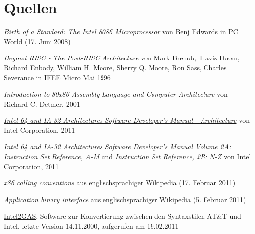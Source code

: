 \section{Quellen}

\begin{thebibliography}{9}

  \href{http://www.pcworld.com/article/146957/birth_of_a_standard_the_intel_8086_microprocessor.html}{
  \emph{Birth of a Standard: The Intel 8086 Microprocessor}}
	von Benj Edwards
	in PC World (17. Juni 2008)
	

	\href{http://www.cse.msu.edu/~enbody/postrisc/postrisc2.htm}{\emph{Beyond RISC - The Post-RISC Architecture}}
	von Mark Brehob, Travis Doom, Richard Enbody, William H. Moore, Sherry Q. Moore, Ron Sass, Charles Severance
	in IEEE Micro Mai 1996

	\emph{Introduction to 80x86 Assembly Language and Computer Architecture}
	von Richard C. Detmer,
	2001

	\href{http://www.intel.com/Assets/PDF/manual/253665.pdf}{
	\emph{Intel 64 and IA-32 Architectures Software Developer's Manual - Architecture}}
	von Intel Corporation,
	2011

	\href{http://www.intel.com/Assets/PDF/manual/253666.pdf}{
	\emph{Intel 64 and IA-32 Architectures Software Developer's Manual Volume 2A: Instruction Set Reference, A-M}} und
	\href{http://www.intel.com/Assets/PDF/manual/253667.pdf}{
	\emph{Instruction Set Reference, 2B: N-Z}}	von Intel Corporation,
	2011

	\href{https://secure.wikimedia.org/wikipedia/en/w/index.php?title=X86_calling_conventions&oldid=414385219}{\emph{x86 calling conventions}} aus englischsprachiger Wikipedia (17. Februar 2011)

	\href{https://secure.wikimedia.org/wikipedia/en/w/index.php?title=Application_binary_interface&oldid=412119478}{\emph{Application binary interface}} aus englischsprachiger Wikipedia (5. Februar 2011)

	\href{http://www.niksula.hut.fi/~mtiihone/intel2gas/}{Intel2GAS}, Software zur Konvertierung zwischen den Syntaxstilen AT\&T und Intel, letzte Version 14.11.2000, aufgerufen am 19.02.2011

\end{thebibliography}
